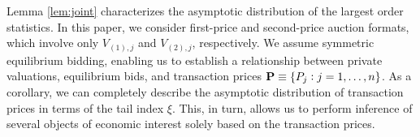 


Lemma \ref{lem:joint} characterizes the asymptotic distribution of the largest order statistics. In this paper, we consider first-price and second-price auction formats, which involve only $V_{(1),j}$ and $V_{(2),j}$, respectively. We assume symmetric equilibrium bidding, enabling us to establish a relationship between private valuations, equilibrium bids, and transaction prices ${\bf P}\equiv\{P_{j}:j =1,\dots,n\}$. As a corollary, we can completely describe the asymptotic distribution of transaction prices in terms of the tail index $\xi$. This, in turn, allows us to perform inference of several objects of economic interest solely based on the transaction prices.

